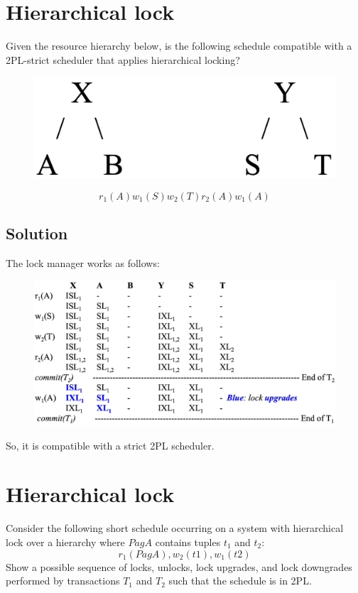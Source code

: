 \documentclass[12pt, a4paper]{report}
\newtheorem[style=M,bodystyle=\normalfont]{theorem}{Theorem}
\newtheorem[style=M,bodystyle=\normalfont]{corollary}{Corollary}
\newtheorem[style=M,bodystyle=\normalfont]{lemma}{Lemma}
\newtheorem[style=M,bodystyle=\normalfont]{definition}{Definition}
\begin{document}
    \section{Hierarchical lock}
        Given the resource hierarchy below, is the following schedule compatible with a 2PL-strict scheduler that applies hierarchical locking?
        \begin{figure}[H]
            \centering
            \includegraphics[width=1\linewidth]{images/HL1.png}
        \end{figure}
        \[r_1(A) w_1(S) w_2(T) r_2(A) w_1(A)\]
    \subsection*{Solution}
        The lock manager works as follows: 
        \begin{figure}[H]
            \centering
            \includegraphics[width=1\linewidth]{images/HLsol.png}
        \end{figure}
        So, it is compatible with a strict 2PL scheduler. 

    \newpage

    \section{Hierarchical lock}
        Consider the following short schedule occurring on a system with hierarchical lock over a hierarchy where $PagA$ contains tuples 
        $t_1$ and $t_2$:
        \[r_1( PagA ), w_2( t1 ), w_1( t2 )\]
        Show a possible sequence of locks, unlocks, lock upgrades, and lock downgrades performed by transactions $T_1$ and $T_2$ such that
        the schedule is in 2PL.
\end{document}
